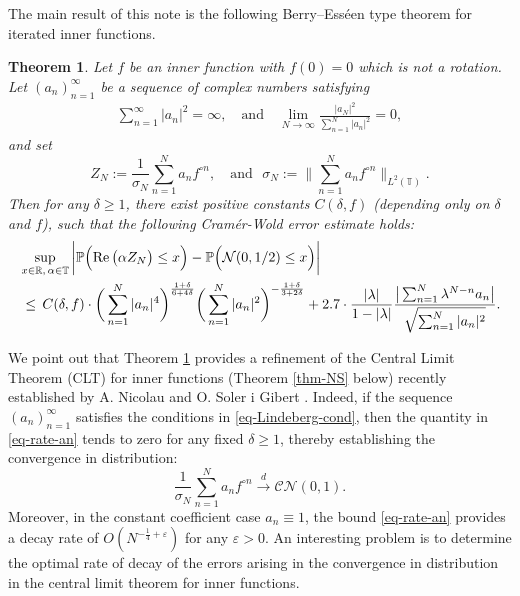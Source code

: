 \documentclass[11pt, reqno]{amsart}
\newtheorem{theorem}{Theorem}
\theoremstyle{definition}
\newtheorem*{Brown-Eagleson Theorem}{The Brown-Eagleson Theorem}
\newcommand{\R}{\mathbb R}
\newcommand{\T}{\mathbb T}
\newcommand{\PP}{\mathbb P}
\newcommand{\cal}{\mathcal}
\begin{document}
	The main result of this note is the following Berry--Ess\'{e}en type theorem for iterated inner functions. 


\begin{theorem}\label{thm-BE-inner}
	Let $f$ be an inner function with $f(0)=0$ which is not a rotation. Let $(a_n)_{n=1}^\infty$ be a sequence of complex numbers satisfying
	\begin{align}\label{eq-Lindeberg-cond}\sum_{n=1}^\infty |a_n|^2 = \infty,\quad \text{and} \quad \lim_{N\to \infty} \frac{|a_N|^2}{\sum_{n=1}^N |a_n|^2} = 0,
	\end{align} 
	and set $$Z_N:= \frac{1}{\sigma_N}\sum_{n=1}^N a_n f^{\circ n},\quad \text{and }\,\, \sigma_N:= \bigg\| \sum_{n=1}^N a_n f^{\circ n }\bigg\|_{L^2(\T)}.$$ Then for any $\delta\geq 1$, there exist positive constants $C(\delta,f)$ (depending only on $\delta$ and $f$), such that the following Cram\'er-Wold error estimate holds: 
		\begin{equation}
			\begin{split}
		&\sup_{x\in \R,\, \alpha \in \T} \bigg| \PP\Big( {\rm Re}\, \big( \alpha Z_N\big) \leq x \Big) - \PP\Big( \cal{N}(0,1/2) \leq x \Big)\bigg|  \\ 
		& \,\leq \,C(\delta,f) \cdot \bigg(\sum_{n=1}^N |a_n|^{4} \bigg)^{\frac{1+\delta}{6+4\delta}}  \bigg(\sum_{n=1}^N |a_n|^{2} \bigg)^{-\frac{1+\delta}{3+2\delta}} + 2.7 \cdot \frac{|\lambda|}{1-|\lambda|} \frac{\big|\sum_{n=1}^N \lambda^{N-n} a_n\big|}{\sqrt{\sum_{n=1}^N |a_n|^2}}.
			\end{split}\label{eq-rate-an}
		\end{equation}
	\end{theorem}

	We point out that Theorem \ref{thm-BE-inner} provides a refinement of the Central Limit Theorem (CLT) for inner functions (Theorem \ref{thm-NS} below) recently established by A. Nicolau and O. Soler i Gibert \cite{NS22,NS24}. Indeed, if the sequence \((a_n)_{n=1}^\infty \) satisfies the conditions in \eqref{eq-Lindeberg-cond}, then the quantity in \eqref{eq-rate-an} tends to zero for any fixed \(\delta \geq 1\), thereby establishing the convergence in distribution: $$\frac{1}{\sigma_N} \sum_{n=1}^N a_n f^{\circ n} \stackrel{d}{\longrightarrow} \cal{CN}(0,1).$$ Moreover, in the constant coefficient case $a_n \equiv 1$, the bound \eqref{eq-rate-an} provides a decay rate of $O(N^{-\frac{1}{4} + \varepsilon})$ for any $\varepsilon > 0$. An interesting problem is to determine the optimal rate of decay of the errors arising in the convergence in distribution in the central limit theorem for inner functions. 
	
\end{document}

